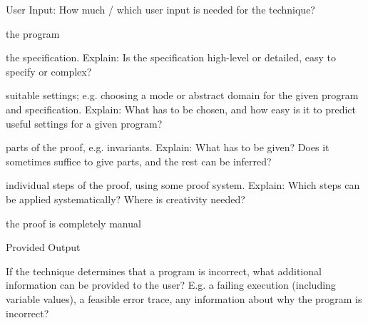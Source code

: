 \documentclass[a4paper]{article}
\begin{document}
\begin{minipage}[t]{0.16\linewidth}
\begin{betterlist}
\begin{betterlist}
		\end{betterlist}
		\item \alert{User Input:} How much / which user input is needed for the technique?
		\begin{betterlist}
			\item \checkboxChecked the program
			\item \checkboxHalfChecked the specification. Explain: Is the specification high-level or detailed, easy to specify or complex?

			\item \checkboxChecked suitable settings; e.g. choosing a mode or abstract domain for the given program and specification. Explain: What has to be chosen, and how easy is it to predict useful settings for a given program?

			\item \checkboxUnchecked parts of the proof, e.g. invariants. Explain: What has to be given? Does it sometimes suffice to give parts, and the rest can be inferred?
			\item \checkboxUnchecked individual steps of the proof, using some proof system. Explain: Which steps can be applied systematically? Where is creativity needed?
			\item \checkboxUnchecked the proof is completely manual
		\end{betterlist}
		\item \alert{Provided Output}
		\begin{betterlist}
			\item If the technique determines that a program is incorrect, what additional information can be provided to the user? E.g. a failing execution (including variable values), a feasible error trace, any information about why the program is incorrect?


\end{betterlist}
\end{betterlist}
\end{minipage}
\end{document}
